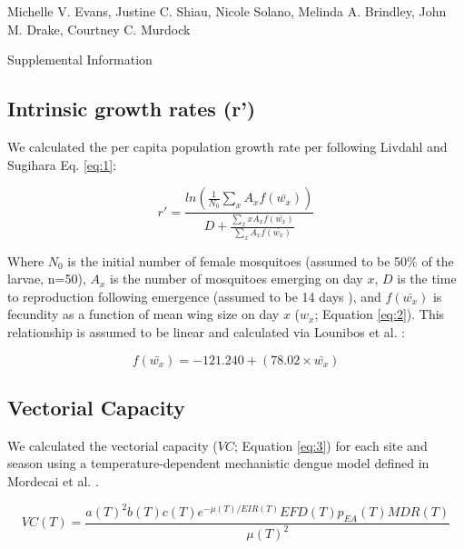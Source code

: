 \documentclass[12pt]{article}
\begin{document}
{\Large
\textbf{}}

\bigskip

Michelle V. Evans,
Justine C. Shiau,
Nicole Solano,
Melinda A. Brindley,
John M. Drake,
Courtney C. Murdock
\smallskip

{\Large{Supplemental Information}}

\subsection{Intrinsic growth rates (r')}

We calculated the per capita population growth rate per following Livdahl and Sugihara \citep{livdahl1984} {Eq. \ref{eq:1}}:

\begin{equation} \label{eq:1}
r' = \frac{ln(\frac{1}{N_0}\sum_{x}^{ }{A_x}f(\bar{w_x}))}{D+\frac{\sum_{x}^{ }xA_xf(\bar{w_x})}{\sum_{x}^{ }A_xf(\bar{w_x})}}
\end{equation}

Where $N_0$ is the initial number of female mosquitoes (assumed to be 50\% of the larvae, n=50), $A_x$ is the number of mosquitoes emerging on day $x$, $D$ is the time to reproduction following emergence (assumed to be 14 days \citep{livdahl1991}), and $f(\bar{w_x})$ is fecundity as a function of mean wing size on day $x$ ($w_x$; Equation \ref{eq:2}). This relationship is assumed to be linear and calculated via Lounibos et al. \citep{lounibos2002}:

\begin{equation} \label{eq:2}
f(\bar{w_x}) = -121.240 + (78.02 \times \bar{w_x})
\end{equation}

\subsection{Vectorial Capacity}

We calculated the vectorial capacity ($VC$; Equation \ref{eq:3}) for each site and season using a temperature-dependent mechanistic dengue model defined in Mordecai et al. \citep{mordecai2017}.

\begin{equation} \label{eq:3}
VC(T) =\frac{a(T)^2b(T)c(T)e^{-\mu (T)/EIR(T)} EFD(T) p_{EA}(T) MDR(T)} {\mu(T)^2}
\end{equation}
\end{document}
